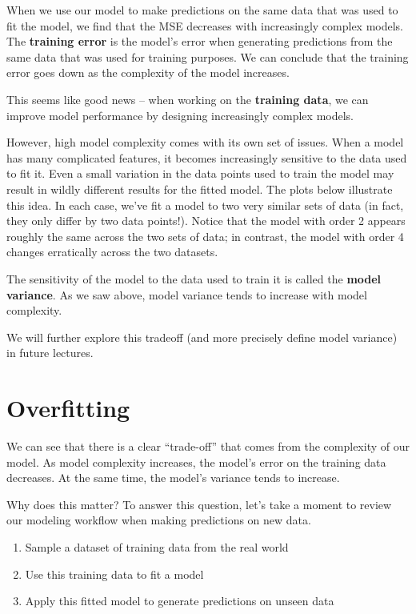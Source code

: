 \documentclass[
  letterpaper,
  DIV=11,
  numbers=noendperiod]{scrreprt}
\providecommand{\tightlist}{%
  \setlength{\itemsep}{0pt}\setlength{\parskip}{0pt}}\usepackage{longtable,booktabs,array}
\begin{document}
When we use our model to make predictions on the same data that was used
to fit the model, we find that the MSE decreases with increasingly
complex models. The \textbf{training error} is the model's error when
generating predictions from the same data that was used for training
purposes. We can conclude that the training error goes down as the
complexity of the model increases.

This seems like good news -- when working on the \textbf{training data},
we can improve model performance by designing increasingly complex
models.

However, high model complexity comes with its own set of issues. When a
model has many complicated features, it becomes increasingly sensitive
to the data used to fit it. Even a small variation in the data points
used to train the model may result in wildly different results for the
fitted model. The plots below illustrate this idea. In each case, we've
fit a model to two very similar sets of data (in fact, they only differ
by two data points!). Notice that the model with order 2 appears roughly
the same across the two sets of data; in contrast, the model with order
4 changes erratically across the two datasets.

The sensitivity of the model to the data used to train it is called the
\textbf{model variance}. As we saw above, model variance tends to
increase with model complexity.

We will further explore this tradeoff (and more precisely define model
variance) in future lectures.

\hypertarget{overfitting}{%
\section{Overfitting}\label{overfitting}}

We can see that there is a clear ``trade-off'' that comes from the
complexity of our model. As model complexity increases, the model's
error on the training data decreases. At the same time, the model's
variance tends to increase.

Why does this matter? To answer this question, let's take a moment to
review our modeling workflow when making predictions on new data.

\begin{enumerate}
\def\labelenumi{\arabic{enumi}.}
\tightlist
\item
  Sample a dataset of training data from the real world
\item
  Use this training data to fit a model
\item
  Apply this fitted model to generate predictions on unseen data
\end{enumerate}
\end{document}
